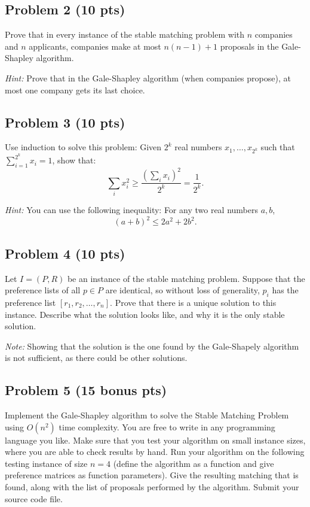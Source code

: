 \documentclass[12pt]{article}
\begin{document}
\subsection*{Problem 2 (10 pts)}

Prove that in every instance of the stable matching problem with $n$ companies and $n$ applicants, companies make at most $n(n-1)+1$ proposals in the Gale-Shapley algorithm.

\textit{Hint:} Prove that in the Gale-Shapley algorithm (when companies propose), at most one company gets its last choice.

\subsection*{Problem 3 (10 pts)}

Use induction to solve this problem: Given $2^k$ real numbers $x_1, \ldots, x_{2^k}$ such that $\sum_{i=1}^{2^k} x_i = 1$, show that:
\[
\sum_{i} x_i^2 \geq \frac{\left(\sum_{i} x_i\right)^2}{2^k} = \frac{1}{2^k}.
\]

\textit{Hint:} You can use the following inequality: For any two real numbers $a, b$, 
\[
(a+b)^2 \leq 2a^2 + 2b^2.
\]

\subsection*{Problem 4 (10 pts)}

Let $I = (P, R)$ be an instance of the stable matching problem. Suppose that the preference lists of all $p \in P$ are identical, so without loss of generality, $p_i$ has the preference list $[r_1, r_2, \ldots, r_n]$. Prove that there is a unique solution to this instance. Describe what the solution looks like, and why it is the only stable solution.

\textit{Note:} Showing that the solution is the one found by the Gale-Shapely algorithm is not sufficient, as there could be other solutions.

\subsection*{Problem 5 (15 bonus pts)}

Implement the Gale-Shapley algorithm to solve the Stable Matching Problem using $O(n^2)$ time complexity. You are free to write in any programming language you like. Make sure that you test your algorithm on small instance sizes, where you are able to check results by hand. Run your algorithm on the following testing instance of size $n=4$ (define the algorithm as a function and give preference matrices as function parameters). Give the resulting matching that is found, along with the list of proposals performed by the algorithm. Submit your source code file.
\end{document}
